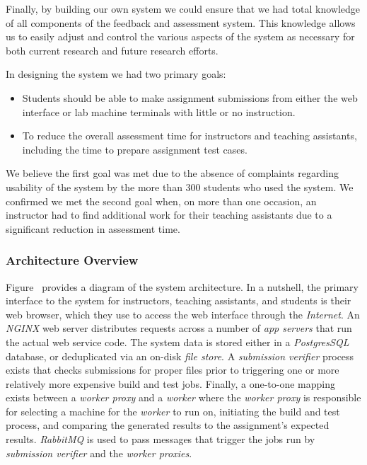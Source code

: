 Finally, by building our own system we could ensure that we had total knowledge
of all components of the feedback and assessment system. This knowledge allows
us to easily adjust and control the various aspects of the system as necessary
for both current research and future research efforts.

In designing the system we had two primary goals:

\begin{itemize}
\item Students should be able to make assignment submissions from either the
  web interface or lab machine terminals with little or no instruction.
\item To reduce the overall assessment time for instructors and teaching
  assistants, including the time to prepare assignment test cases.
\end{itemize}

We believe the first goal was met due to the absence of complaints regarding
usability of the system by the more than 300 students who used the system. We
confirmed we met the second goal when, on more than one occasion, an instructor
had to find additional work for their teaching assistants due to a significant
reduction in assessment time.


\subsubsection{Architecture Overview}
Figure~ provides a diagram of the system
architecture. In a nutshell, the primary interface to the system for
instructors, teaching assistants, and students is their web browser, which they
use to access the web interface through the \emph{Internet}. An \emph{NGINX}
web server distributes requests across a number of \emph{app servers} that run
the actual web service code. The system data is stored either in a
\emph{PostgresSQL} database, or deduplicated via an on-disk \emph{file
  store}. A \emph{submission verifier} process exists that checks submissions
for proper files prior to triggering one or more relatively more expensive
build and test jobs. Finally, a one-to-one mapping exists between a
\emph{worker proxy} and a \emph{worker} where the \emph{worker proxy} is
responsible for selecting a machine for the \emph{worker} to run on, initiating
the build and test process, and comparing the generated results to the
assignment's expected results. \emph{RabbitMQ} is used to pass messages that
trigger the jobs run by \emph{submission verifier} and the \emph{worker
  proxies}.

